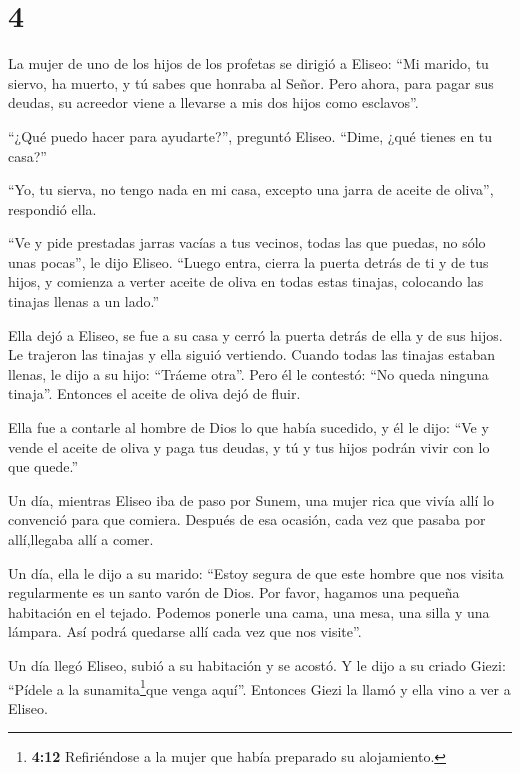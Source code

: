 \hypertarget{section-3}{%
\section{4}\label{section-3}}

 La mujer de uno de los hijos de los profetas se dirigió a
Eliseo: ``Mi marido, tu siervo, ha muerto, y tú sabes que honraba al
Señor. Pero ahora, para pagar sus deudas, su acreedor viene a llevarse a
mis dos hijos como esclavos''.

 ``¿Qué puedo hacer para ayudarte?'', preguntó Eliseo.
``Dime, ¿qué tienes en tu casa?''

``Yo, tu sierva, no tengo nada en mi casa, excepto una jarra de aceite
de oliva'', respondió ella.

 ``Ve y pide prestadas jarras vacías a tus vecinos, todas
las que puedas, no sólo unas pocas'', le dijo Eliseo. 
``Luego entra, cierra la puerta detrás de ti y de tus hijos, y comienza
a verter aceite de oliva en todas estas tinajas, colocando las tinajas
llenas a un lado.''

 Ella dejó a Eliseo, se fue a su casa y cerró la puerta
detrás de ella y de sus hijos. Le trajeron las tinajas y ella siguió
vertiendo.  Cuando todas las tinajas estaban llenas, le dijo
a su hijo: ``Tráeme otra''. Pero él le contestó: ``No queda ninguna
tinaja''. Entonces el aceite de oliva dejó de fluir.

 Ella fue a contarle al hombre de Dios lo que había
sucedido, y él le dijo: ``Ve y vende el aceite de oliva y paga tus
deudas, y tú y tus hijos podrán vivir con lo que quede.''

 Un día, mientras Eliseo iba de paso por Sunem, una mujer
rica que vivía allí lo convenció para que comiera. Después de esa
ocasión, cada vez que pasaba por allí,llegaba allí a comer.

 Un día, ella le dijo a su marido: ``Estoy segura de que
este hombre que nos visita regularmente es un santo varón de Dios.
 Por favor, hagamos una pequeña habitación en el tejado.
Podemos ponerle una cama, una mesa, una silla y una lámpara. Así podrá
quedarse allí cada vez que nos visite''.

 Un día llegó Eliseo, subió a su habitación y se acostó.
 Y le dijo a su criado Giezi: ``Pídele a la
sunamita\footnote{\textbf{4:12} Refiriéndose a la mujer que había
  preparado su alojamiento.}que venga aquí''. Entonces Giezi la llamó y
ella vino a ver a Eliseo.

